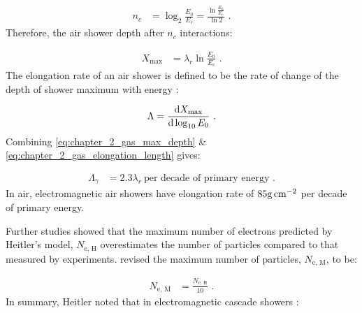 \begin{equation}
    \begin{aligned}
    n_c&=\log_2 \frac{E_0}{E_c} =\frac{\ln{\frac{E_0}{E_c}}}{\ln 2}\text{ .}
    \end{aligned} \label{eq:chapter_2_gas_max_interactions}
\end{equation}
\noindent Therefore, the air shower depth after $n_c$ interactions:

\begin{equation}
    \begin{aligned}
    X_\text{max}&=\lambda_r \ln\frac{E_0}{E_c}\text{ .}
    \end{aligned} \label{eq:chapter_2_gas_max_depth}
\end{equation}
\noindent The elongation rate of an air shower is defined to be the rate of change of the depth of shower maximum with energy \citep{MATTHEWS2005387}:

\begin{equation}
    \begin{aligned}
    \Lambda=\dv{X_\text{max}}{\log_{10}E_0} \text{ .}
    \end{aligned} \label{eq:chapter_2_gas_elongation_length}
\end{equation}
\noindent Combining \autoref{eq:chapter_2_gas_max_depth} \& \ref{eq:chapter_2_gas_elongation_length} gives:

\begin{equation}
    \begin{aligned}
    \Lambda_\gamma &= 2.3\lambda_r ~ \text{per decade of primary energy}\text{ .}
    \end{aligned}
\end{equation}
\noindent In air, electromagnetic air showers have elongation rate of $85\si{\gram\per\centi\meter\squared}$ per decade of primary energy.
\newpar

Further studies \citep{MATTHEWS2005387} showed that the maximum number of electrons predicted by Heitler's model, $N_\text{e, H}$ overestimates the number of particles compared to that measured by experiments. \cite{MATTHEWS2005387} revised the maximum number of particles, $N_\text{e, M}$, to be:

\begin{equation}
    \begin{aligned}
    N_\text{e, M} &= \frac{N_\text{e, H}}{10} \text{ .}
    \end{aligned} \label{eq:chapter_2_gas_e_correction_factor}
\end{equation}
\noindent In summary, Heitler noted that in electromagnetic cascade showers \citep{1954qtr..book.....H}:

